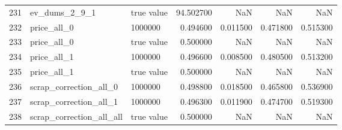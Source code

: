 \begin{tabular}{lllrrrr}
231 & ev_dums_2_9_1 & true value & 94.502700 & NaN & NaN & NaN \\
232 & price_all_0 & 1000000 & 0.494600 & 0.011500 & 0.471800 & 0.515300 \\
233 & price_all_0 & true value & 0.500000 & NaN & NaN & NaN \\
234 & price_all_1 & 1000000 & 0.496600 & 0.008500 & 0.480500 & 0.513200 \\
235 & price_all_1 & true value & 0.500000 & NaN & NaN & NaN \\
236 & scrap_correction_all_0 & 1000000 & 0.498800 & 0.018500 & 0.465800 & 0.536900 \\
237 & scrap_correction_all_1 & 1000000 & 0.496300 & 0.011900 & 0.474700 & 0.519300 \\
238 & scrap_correction_all_all & true value & 0.500000 & NaN & NaN & NaN \\
\bottomrule
\end{tabular}

